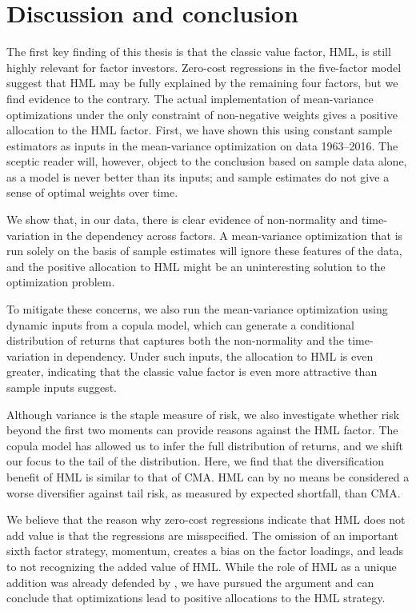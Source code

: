 
\section{Discussion and conclusion} %
\label{sec:discussion_conclusion}

The first key finding of this thesis is that the classic value factor, HML, is still highly relevant for factor investors. Zero-cost regressions in the five-factor model suggest that HML may be fully explained by the remaining four factors, but we find evidence to the contrary. The actual implementation of mean-variance optimizations under the only constraint of non-negative weights gives a positive allocation to the HML factor. First, we have shown this using constant sample estimators as inputs in the mean-variance optimization on data 1963--2016. The sceptic reader will, however, object to the conclusion based on sample data alone, as a model is never better than its inputs; and sample estimates do not give a sense of optimal weights over time.

We show that, in our data, there is clear evidence of non-normality and time-variation in the dependency across factors. A mean-variance optimization that is run solely on the basis of sample estimates will ignore these features of the data, and the positive allocation to HML might be an uninteresting solution to the optimization problem.

To mitigate these concerns, we also run the mean-variance optimization using dynamic inputs from a copula model, which can generate a conditional distribution of returns that captures both the non-normality and the time-variation in dependency. Under such inputs, the allocation to HML is even greater, indicating that the classic value factor is even more attractive than sample inputs suggest.

Although variance is the staple measure of risk, we also investigate whether risk beyond the first two moments can provide reasons against the HML factor. The copula model has allowed us to infer the full distribution of returns, and we shift our focus to the tail of the distribution. Here, we find that the diversification benefit of HML is similar to that of CMA. HML can by no means be considered a worse diversifier against tail risk, as measured by expected shortfall, than CMA.

We believe that the reason why zero-cost regressions indicate that HML does not add value is that the regressions are misspecified. The omission of an important sixth factor strategy, momentum, creates a bias on the factor loadings, and leads to not recognizing the added value of HML. While the role of HML as a unique addition was already defended by \textcite{Asness2015}, we have pursued the argument and can conclude that optimizations lead to positive allocations to the HML strategy.

